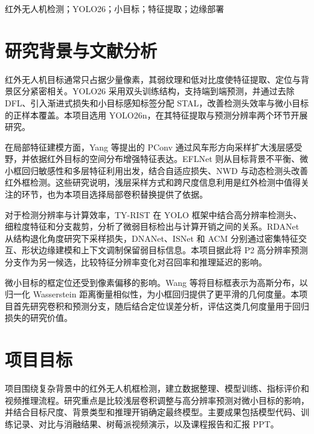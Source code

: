 \begin{abstract}
针对复杂背景下红外无人机目标尺寸小、对比度低和背景干扰强的问题，本项目采用 YOLO26n 目标检测框架，研究浅层特征提取与高分辨率预测对微小目标检出的影响。以 SIRST-UAVB 为主数据集，结合通用红外小目标数据开展对照实验，考察 PConv 卷积和 P2 检测分支的作用。项目从检测精度、漏检误报和端到端延迟三个方面评价模型，并在树莓派与 H10 平台开展视频推理验证，形成数据处理流程、检测模型、实验分析与课程汇报材料。
\end{abstract}

\begin{IEEEkeywords}
红外无人机检测；YOLO26；小目标；特征提取；边缘部署
\end{IEEEkeywords}

\section{研究背景与文献分析}
红外无人机目标通常只占据少量像素，其弱纹理和低对比度使特征提取、定位与背景区分紧密相关。YOLO26 采用双头训练结构，支持端到端预测，并通过去除 DFL、引入渐进式损失和小目标感知标签分配 STAL，改善检测头效率与微小目标的正样本覆盖。本项目选用 YOLO26n，在其特征提取与预测分辨率两个环节开展研究\cite{jocher2026yolo26,ultralytics2026docs}。

在局部特征建模方面，Yang 等提出的 PConv 通过风车形方向采样扩大浅层感受野，并依据红外目标的空间分布增强特征表达\cite{yang2025pconv}。EFLNet 则从目标背景不平衡、微小框回归敏感性和多层特征利用出发，结合自适应损失、NWD 与动态检测头改善红外框检测\cite{yang2024eflnet}。这些研究说明，浅层采样方式和跨尺度信息利用是红外检测中值得关注的环节，也为本项目选择局部卷积替换提供了依据。

对于检测分辨率与计算效率，TY-RIST 在 YOLO 框架中结合高分辨率检测头、细粒度特征和分支裁剪，分析了微弱目标检出与计算开销之间的关系\cite{atrash2025tyrist}。RDANet 从结构退化角度研究下采样损失，DNANet、ISNet 和 ACM 分别通过密集特征交互、形状边缘建模和上下文调制保留弱目标信息\cite{liu2026rdanet,li2023dnanet,zhang2022isnet,dai2021acm}。本项目据此将 P2 高分辨率预测分支作为另一候选，比较特征分辨率变化对召回率和推理延迟的影响。

微小目标的框定位还受到像素偏移的影响。Wang 等将目标框表示为高斯分布，以归一化 Wasserstein 距离衡量相似性，为小框回归提供了更平滑的几何度量\cite{wang2021nwd}。本项目首先研究卷积和预测分支，随后结合定位误差分析，评估这类几何度量用于回归损失的研究价值。

\IEEEpubidadjcol

\section{项目目标}
项目围绕复杂背景中的红外无人机框检测，建立数据整理、模型训练、指标评价和视频推理流程。研究重点是比较浅层卷积调整与高分辨率预测对微小目标的影响，并结合目标尺度、背景类型和推理开销确定最终模型。主要成果包括模型代码、训练记录、对比与消融结果、树莓派视频演示，以及课程报告和汇报 PPT。

